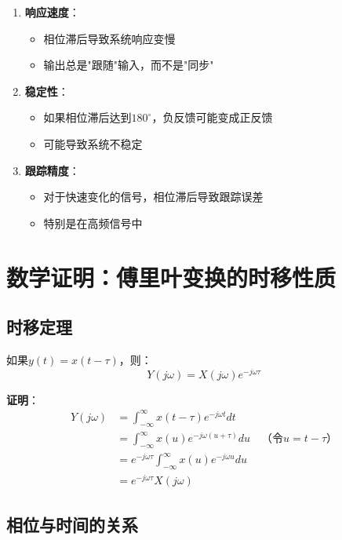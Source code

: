 \documentclass[12pt,a4paper]{article}
\begin{document}
\begin{enumerate}
\item \textbf{响应速度}：
\begin{itemize}
\item 相位滞后导致系统响应变慢
\item 输出总是"跟随"输入，而不是"同步"
\end{itemize}

\item \textbf{稳定性}：
\begin{itemize}
\item 如果相位滞后达到$180^\circ$，负反馈可能变成正反馈
\item 可能导致系统不稳定
\end{itemize}

\item \textbf{跟踪精度}：
\begin{itemize}
\item 对于快速变化的信号，相位滞后导致跟踪误差
\item 特别是在高频信号中
\end{itemize}
\end{enumerate}

\section{数学证明：傅里叶变换的时移性质}

\subsection{时移定理}

如果$y(t) = x(t - \tau)$，则：
\begin{equation}
Y(j\omega) = X(j\omega) e^{-j\omega \tau}
\end{equation}

\textbf{证明}：
\begin{align}
Y(j\omega) &= \int_{-\infty}^{\infty} x(t - \tau) e^{-j\omega t} dt \\
           &= \int_{-\infty}^{\infty} x(u) e^{-j\omega (u + \tau)} du \quad \text{（令$u = t - \tau$）} \\
           &= e^{-j\omega \tau} \int_{-\infty}^{\infty} x(u) e^{-j\omega u} du \\
           &= e^{-j\omega \tau} X(j\omega)
\end{align}

\subsection{相位与时间的关系}
\end{document}
